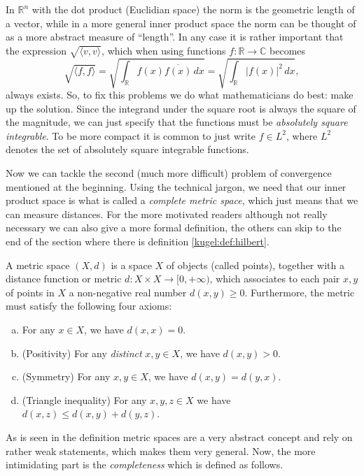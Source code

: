 In \(\mathbb{R}^n\) with the dot product (Euclidian space) the norm is the
geometric length of a vector, while in a more general inner product space the
norm can be thought of as a more abstract measure of ``length''. In any case
it is rather important that the expression \(\sqrt{\langle v, v \rangle}\),
which when using functions \(f: \mathbb{R} \to \mathbb{C}\) becomes
\[
  \sqrt{\langle f, f \rangle} =
  \sqrt{\int_\mathbb{R} f(x) \overline{f(x)} \, dx} =
  \sqrt{\int_\mathbb{R} |f(x)|^2 \, dx},
\]
always exists. So, to fix this problems we do what mathematicians do best:
make up the solution. Since the integrand under the square root is always the
square of the magnitude, we can just specify that the functions must be
\emph{absolutely square integrable}. To be more compact it is common to just
write \(f \in L^2\), where \(L^2\) denotes the set of absolutely square
integrable functions.

Now we can tackle the second (much more difficult) problem of convergence
mentioned at the beginning. Using the technical jargon, we need that our inner
product space is what is called a \emph{complete metric space}, which just
means that we can measure distances. For the more motivated readers although
not really necessary we can also give a more formal definition, the others can
skip to the end of the section where there is definition
\ref{kugel:def:hilbert}.

\begin{definition}
  \nocite{tao_analysis_2016}
  A metric space \((X, d)\) is a space \(X\) of objects (called points),
  together with a distance function or metric \(d: X \times X \to [0,
  +\infty)\), which associates to each pair \(x, y\) of points in \(X\) a
  non-negative real number \(d(x, y) \geq 0\). Furthermore, the metric must
  satisfy the following four axioms:
  \begin{enumerate}[(a)]
    \item For any \(x\in X\), we have \(d(x, x) = 0\).
    \item (Positivity) For any \emph{distinct} \(x, y \in X\), we have
      \(d(x,y) > 0\).
    \item (Symmetry) For any \(x,y \in X\), we have \(d(x, y) = d(y, x)\).
    \item (Triangle inequality) For any \(x, y, z \in X\) we have
      \(d(x, z) \leq d(x, y) + d(y, z)\).
  \end{enumerate}
\end{definition}

As is seen in the definition metric spaces are a very abstract concept and
rely on rather weak statements, which makes them very general. Now, the more
intimidating part is the \emph{completeness} which is defined as follows.

